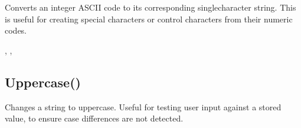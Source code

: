 \documentclass[letterpaper,10pt,english]{sphinxmanual}
\begin{document}
\sphinxAtStartPar
{}

\sphinxAtStartPar
Converts an integer ASCII code to its corresponding single\sphinxhyphen{}character string. This is useful for creating special characters or control characters from their numeric codes.

\sphinxAtStartPar
{}

\begin{sphinxVerbatim}[commandchars=\\\{\}]
\end{sphinxVerbatim}

\sphinxAtStartPar
{}

\begin{sphinxVerbatim}[commandchars=\\\{\}]
\end{sphinxVerbatim}

\sphinxAtStartPar
{}

\sphinxAtStartPar
{}, , 

\ignorespaces 

\subsection{Uppercase()}
\label{\detokenize{reference/peblstring:uppercase}}\label{\detokenize{reference/peblstring:index-8}}
\sphinxAtStartPar
{}

\sphinxAtStartPar
{}

\sphinxAtStartPar
Changes a string to uppercase.  Useful for testing user                 input against a stored value, to ensure case differences                are not detected.
\end{document}
